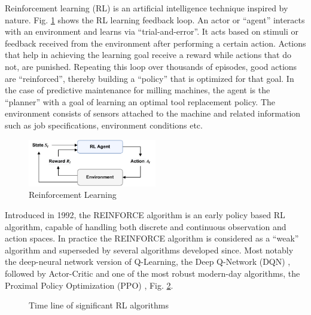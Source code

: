 \documentclass[a4paper, 12pt]{article}
\begin{document}
Reinforcement learning (RL) is an artificial intelligence technique inspired by nature. Fig. \ref{fig:RL-loop} \citep{barto2018} shows the RL learning feedback loop. An actor or ``agent'' interacts with an environment and learns via ``trial-and-error''. It acts based on stimuli or feedback received from the environment after performing a certain action. Actions that help in achieving the learning goal receive a reward while actions that do not, are punished. Repeating this loop over thousands of episodes, good actions are ``reinforced'', thereby building a ``policy'' that is optimized for that goal. In the case of predictive maintenance for milling machines, the agent is the ``planner'' with a goal of learning an optimal tool replacement policy. The environment consists of sensors attached to the machine and related information such as job specifications, environment conditions etc.

\begin{figure}[!h]
	\centering
	\includegraphics[width=0.5\textwidth]{RL-loop.pdf}
	\caption{Reinforcement Learning}
	\label{fig:RL-loop}
\end{figure}

Introduced in 1992, the REINFORCE algorithm \citep{REINFORCE-williams1992} is an early policy based RL algorithm, capable of handling both discrete and continuous observation and action spaces. In practice the REINFORCE algorithm is considered as a ``weak'' algorithm and superseded by several algorithms developed since. Most notably the deep-neural network version of Q-Learning, the Deep Q-Network (DQN) \citep{DQN-mnih2013}, followed by Actor-Critic \citep{A2C-mnih2016} and one of the most robust modern-day algorithms, the Proximal Policy Optimization (PPO) \citep{PPO-schulman2017}, Fig. \ref{fig:TimeLine}.
\begin{figure}[h]	
	\startchronology[startyear=1940, startdate=false, stopdate=false, arrow=false, color=codegray, height=.5ex]
	\stopchronology
	\vspace{-36pt}
	\caption{Time line of significant RL algorithms}
	\label{fig:TimeLine}
\end{figure}
\end{document}
